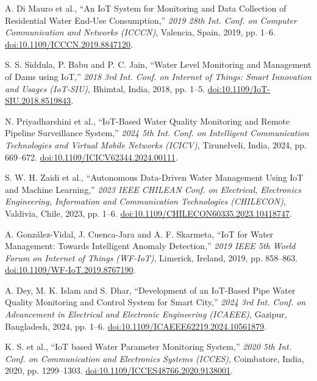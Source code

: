 \documentclass[conference]{IEEEtran}
\begin{document}
\begin{thebibliography}{99}
    A. Di Mauro et al., ``An IoT System for Monitoring and Data Collection of Residential Water End-Use Consumption,'' \textit{2019 28th Int. Conf. on Computer Communication and Networks (ICCCN)}, Valencia, Spain, 2019, pp. 1–6. \href{https://doi.org/10.1109/ICCCN.2019.8847120}{doi:10.1109/ICCCN.2019.8847120}.

    S. S. Siddula, P. Babu and P. C. Jain, ``Water Level Monitoring and Management of Dams using IoT,'' \textit{2018 3rd Int. Conf. on Internet of Things: Smart Innovation and Usages (IoT-SIU)}, Bhimtal, India, 2018, pp. 1–5. \href{https://doi.org/10.1109/IoT-SIU.2018.8519843}{doi:10.1109/IoT-SIU.2018.8519843}.

    N. Priyadharshini et al., ``IoT-Based Water Quality Monitoring and Remote Pipeline Surveillance System,'' \textit{2024 5th Int. Conf. on Intelligent Communication Technologies and Virtual Mobile Networks (ICICV)}, Tirunelveli, India, 2024, pp. 669–672. \href{https://doi.org/10.1109/ICICV62344.2024.00111}{doi:10.1109/ICICV62344.2024.00111}.

    S. W. H. Zaidi et al., ``Autonomous Data-Driven Water Management Using IoT and Machine Learning,'' \textit{2023 IEEE CHILEAN Conf. on Electrical, Electronics Engineering, Information and Communication Technologies (CHILECON)}, Valdivia, Chile, 2023, pp. 1–6. \href{https://doi.org/10.1109/CHILECON60335.2023.10418747}{doi:10.1109/CHILECON60335.2023.10418747}.

    A. González-Vidal, J. Cuenca-Jara and A. F. Skarmeta, ``IoT for Water Management: Towards Intelligent Anomaly Detection,'' \textit{2019 IEEE 5th World Forum on Internet of Things (WF-IoT)}, Limerick, Ireland, 2019, pp. 858–863. \href{https://doi.org/10.1109/WF-IoT.2019.8767190}{doi:10.1109/WF-IoT.2019.8767190}.

    A. Dey, M. K. Islam and S. Dhar, ``Development of an IoT-Based Pipe Water Quality Monitoring and Control System for Smart City,'' \textit{2024 3rd Int. Conf. on Advancement in Electrical and Electronic Engineering (ICAEEE)}, Gazipur, Bangladesh, 2024, pp. 1–6. \href{https://doi.org/10.1109/ICAEEE62219.2024.10561879}{doi:10.1109/ICAEEE62219.2024.10561879}.

    K. S. et al., ``IoT based Water Parameter Monitoring System,'' \textit{2020 5th Int. Conf. on Communication and Electronics Systems (ICCES)}, Coimbatore, India, 2020, pp. 1299–1303. \href{https://doi.org/10.1109/ICCES48766.2020.9138001}{doi:10.1109/ICCES48766.2020.9138001}.


\end{thebibliography}
\end{document}
